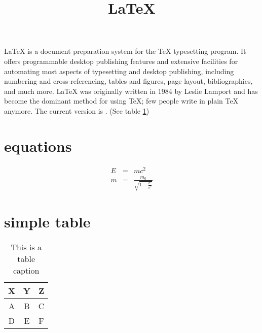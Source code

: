 \documentclass[12pt,draft]{article}
\title{\LaTeX}
\date{}
\begin{document}
  \maketitle
  \LaTeX{} is a document preparation system for the \TeX{}
  typesetting program\cite{Turner2011}. It offers programmable desktop publishing
  features and extensive facilities for automating most aspects of
  typesetting and desktop publishing, including numbering and
  cross-referencing, tables and figures, page layout, bibliographies,
  and much more. \LaTeX{} was originally written in 1984 by Leslie
  Lamport and has become the dominant method for using \TeX; few
  people write in plain \TeX{} anymore. The current version  is
  \LaTeXe. (See table \ref{table1})

\section{equations}
  \begin{eqnarray}
    E &=& mc^2                              \\
    m &=& \frac{m_0}{\sqrt{1-\frac{v^2}{c^2}}}
   \end{eqnarray}

\section{simple table}

\begin{table}[htb]
\label{table1}
\caption{This is a table caption}
\centering
\begin{tabular}{||c||c||c}
\hline 
\textbf{X} & Y & Z \\ 
\hline 
A & B & C \\ 
\hline 
D & E & F \\ 
\hline 
\end{tabular} 
\end{table}


 
\end{document}
